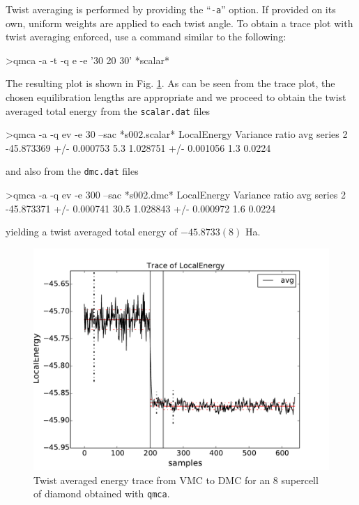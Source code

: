 Twist averaging is performed by providing the ``\texttt{-a}'' 
option.  If provided on its own, uniform weights are applied 
to each twist angle.  To obtain a trace plot with twist averaging 
enforced, use a command similar to the following:
\begin{shade}
>qmca -a -t -q e -e '30 20 30' *scalar*
\end{shade}
\noindent
The resulting plot is shown in Fig. \ref{fig:qmca_twist_average}.
As can be seen from the trace plot, the chosen equilibration lengths 
are appropriate and we proceed to obtain the twist averaged total energy
from the \texttt{scalar.dat} files
\begin{shade}
>qmca -a -q ev -e 30 --sac *s002.scalar*
                            LocalEnergy               Variance           ratio 
avg  series 2  -45.873369 +/- 0.000753    5.3   1.028751 +/- 0.001056    1.3   0.0224 
\end{shade}
\noindent
and also from the \texttt{dmc.dat} files
\begin{shade}
>qmca -a -q ev -e 300 --sac *s002.dmc*
                            LocalEnergy               Variance           ratio 
avg  series 2  -45.873371 +/- 0.000741   30.5   1.028843 +/- 0.000972    1.6   0.0224 
\end{shade}
\noindent
yielding a twist averaged total energy of $-45.8733(8)$ Ha. 

\begin{figure}
\begin{center}
\includegraphics[trim = 0mm 0mm 0mm 0mm, clip,width=0.75\columnwidth]{figures/qmca_twist_average_trace.pdf}
\end{center}
\caption{Twist averaged energy trace from VMC to DMC for an 8 supercell of diamond obtained with \texttt{qmca}.  
\label{fig:qmca_twist_average}
}
\end{figure}

